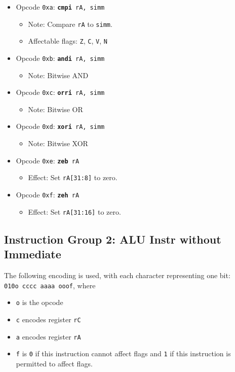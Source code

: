 \documentclass{article}
\begin{document}
\begin{itemize}
\begin{itemize}
		\end{itemize}
		\item Opcode \texttt{0xa}:
			\texttt{\textbf{cmpi} rA, simm}
		\begin{itemize}
			\item Note:  Compare \texttt{rA} to \texttt{simm}.
			\item Affectable flags:
				\texttt{Z}, \texttt{C}, \texttt{V}, \texttt{N}
		\end{itemize}
		\item Opcode \texttt{0xb}:
			\texttt{\textbf{andi} rA, simm}
		\begin{itemize}
			\item Note:  Bitwise AND
		\end{itemize}
		\item Opcode \texttt{0xc}:
			\texttt{\textbf{orri} rA, simm}
		\begin{itemize}
			\item Note:  Bitwise OR
		\end{itemize}
		\item Opcode \texttt{0xd}:
			\texttt{\textbf{xori} rA, simm}
		\begin{itemize}
			\item Note:  Bitwise XOR
		\end{itemize}
		\item Opcode \texttt{0xe}:
			\texttt{\textbf{zeb} rA}
		\begin{itemize}
			\item Effect:  Set \texttt{rA[31:8]} to zero.
		\end{itemize}
		\item Opcode \texttt{0xf}:
			\texttt{\textbf{zeh} rA}
		\begin{itemize}
			\item Effect:  Set \texttt{rA[31:16]} to zero.
		\end{itemize}
	\end{itemize}

	\doublespacing

	\subsection{Instruction Group 2:  ALU Instr without Immediate}
	The following encoding is used, with each character representing one
	bit:  \\
	\texttt{010o cccc aaaa ooof}, where

	\singlespacing
	\begin{itemize}
		\item \texttt{o} is the opcode
		\item \texttt{c} encodes register \texttt{rC}
		\item \texttt{a} encodes register \texttt{rA}
		\item \texttt{f} is \texttt{0} if this instruction cannot affect
		flags and \texttt{1} if this instruction is permitted to affect
		flags. 
	\end{itemize}
	\doublespacing
\end{document}
